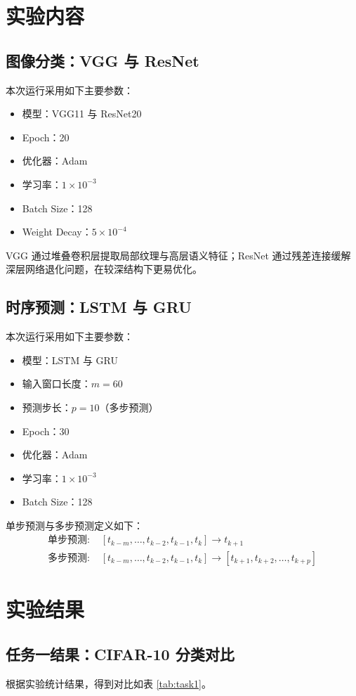 \documentclass[12pt,a4paper]{ctexart}
\begin{document}
\section{实验内容}
\subsection{图像分类：VGG 与 ResNet}
本次运行采用如下主要参数：
\begin{itemize}
  \item 模型：VGG11 与 ResNet20
  \item Epoch：20
  \item 优化器：Adam
  \item 学习率：$1\times10^{-3}$
  \item Batch Size：128
  \item Weight Decay：$5\times10^{-4}$
\end{itemize}

VGG 通过堆叠卷积层提取局部纹理与高层语义特征；ResNet 通过残差连接缓解深层网络退化问题，在较深结构下更易优化。

\subsection{时序预测：LSTM 与 GRU}
本次运行采用如下主要参数：
\begin{itemize}
  \item 模型：LSTM 与 GRU
  \item 输入窗口长度：$m=60$
  \item 预测步长：$p=10$（多步预测）
  \item Epoch：30
  \item 优化器：Adam
  \item 学习率：$1\times10^{-3}$
  \item Batch Size：128
\end{itemize}

单步预测与多步预测定义如下：
\begin{align}
\text{单步预测: } &[t_{k-m},\dots,t_{k-2},t_{k-1},t_k] \rightarrow t_{k+1} \\
\text{多步预测: } &[t_{k-m},\dots,t_{k-2},t_{k-1},t_k] \rightarrow [t_{k+1},t_{k+2},\dots,t_{k+p}]
\end{align}

\section{实验结果}
\subsection{任务一结果：CIFAR-10 分类对比}
根据实验统计结果，得到对比如表 \ref{tab:task1}。
\end{document}
